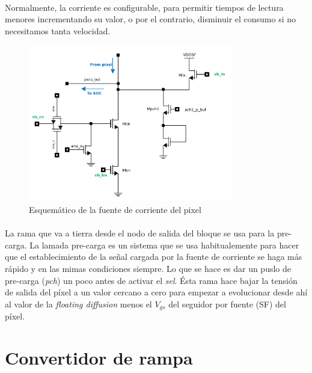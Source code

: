 \paragraph{}
Normalmente, la corriente es configurable, para permitir tiempos de lectura menores
incrementando su  valor, o por el contrario, disminuir el consumo si no necesitamos tanta
velocidad.

\begin{figure}[h]
	\centering
	\includegraphics[width=0.8\textwidth]{svg/pxcs_sch.pdf}
	\caption{Esquemático de la fuente de corriente del pixel}
	\label{fig:pxcs_sch}
\end{figure}

\paragraph{}
La rama que va a tierra desde el nodo de salida del bloque se usa para la pre-carga.
La lamada pre-carga es un sistema que se usa habitualemente para hacer que el
establecimiento de la señal cargada por la fuente de corriente se haga más rápido
y en las mimas condiciones siempre. Lo que se hace es dar un puslo de pre-carga
(\textit{pch}) un poco antes de activar el \textit{sel}. Ésta rama hace bajar la
tensión de salida del píxel a un valor cercano a cero para empezar a evolucionar
desde ahí al valor de la \textit{floating diffusion} menos el $V_{gs}$ del seguidor
por fuente (SF) del píxel.


\section{Convertidor de rampa}\label{cap:ro_sch_conv}

